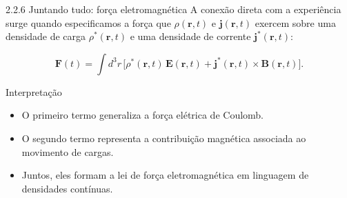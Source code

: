 \documentclass[aspectratio=169]{beamer}
\begin{document}
\begin{frame}{2.2.6 Juntando tudo: força eletromagnética}
A conexão direta com a experiência surge quando especificamos a força que \(\rho(\mathbf{r},t)\) e \(\mathbf{j}(\mathbf{r},t)\) exercem sobre uma densidade de carga \(\rho^{*}(\mathbf{r},t)\) e uma densidade de corrente \(\mathbf{j}^{*}(\mathbf{r},t)\):

\begin{equation}
\mathbf{F}(t)
=
\int d^3r\,
\Big[
\rho^{*}(\mathbf{r},t)\,\mathbf{E}(\mathbf{r},t)
+
\mathbf{j}^{*}(\mathbf{r},t)\times\mathbf{B}(\mathbf{r},t)
\Big].
\tag{2.35}
\label{eq:force-235}
\end{equation}

\begin{block}{Interpretação}
\begin{itemize}
\item O primeiro termo generaliza a força elétrica de Coulomb.
\item O segundo termo representa a contribuição magnética associada ao movimento de cargas.
\item Juntos, eles formam a lei de força eletromagnética em linguagem de densidades contínuas.
\end{itemize}
\end{block}
\end{frame}
\end{document}
